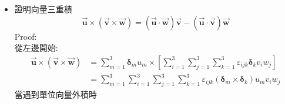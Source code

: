 \documentclass[../main.tex]{subfiles}
\begin{document}
\begin{itemize}
\begin{itemize}
\begin{align}
        - \sum_{i=1}^3 \sum_{j=1}^3 \sum_{m=1}^3 \sum_{n=1}^3 \delta_{in}\delta_{jm} v_i w_j v_m w_n \nonumber\\
        &= \sum_{i=1}^3 \sum_{j=1}^3 v_i w_j v_i w_j - \sum_{i=1}^3 \sum_{j=1}^3 v_i w_j v_j w_i \nonumber\\
        &= \sum_{i=1}^3 \sum_{j=1}^3 v_i^2 w_j^2 - \sum_{i=1}^3 \sum_{j=1}^3 v_i v_j w_i w_j 
      \end{align} 
      接著看左邊第二項:
      \begin{align}
        \left( \vec {\bm v} \cdot \vec {\bm w} \right)^2 &= \left(
          \sum_{i=1}^3 v_i w_i
        \right)^2 \nonumber\\
        &= \sum_{i=1}^3 \sum_{j=1}^3 v_i w_i v_j w_j
      \end{align}
      將兩項相加:
      \begin{align}
        \left(
          [\vec {\bm v} \times \vec {\bm w}] \cdot [\vec {\bm v} \times \vec {\bm w}]
        \right) + \left( \vec {\bm v} \cdot \vec {\bm w} \right)^2 &= 
        \left(
          \sum_{i=1}^3 \sum_{j=1}^3 v_i^2 w_j^2 - \sum_{i=1}^3 \sum_{j=1}^3 v_i v_j w_i w_j
        \right) + \left(
          \sum_{i=1}^3 \sum_{j=1} v_i w_i v_j w_j
        \right) \nonumber\\
        &= \sum_{i=1}^3 \sum_{j=1}^3 v_i^2 w_j^2 \nonumber\\
        &= \left(\sum_{i=1}^3 v_i^2\right) \left(\sum_{j=1}^3 w_j^2\right) \nonumber\\
        &= v^2 w^2
      \end{align}
    \item 證明向量三重積
      \begin{equation}
        \vec {\bm u} \times (\vec {\bm v} \times \vec {\bm w}) = (\vec {\bm u} \cdot \vec {\bm w})\vec {\bm v} - (\vec {\bm u} \cdot \vec {\bm v})\vec {\bm w}
      \end{equation}
      Proof:\\
      從左邊開始:
      \begin{align}
        \vec {\bm u} \times (\vec {\bm v} \times \vec {\bm w}) &= \sum_{m=1}^3 \bm \delta_m u_m \times
        \left[
          \sum_{i=1}^3 \sum_{j=1}^3 \sum_{k=1}^3 \varepsilon_{ijk} \bm \delta_k v_i w_j
        \right] \nonumber\\
        &= \sum_{m=1}^3 \sum_{i=1}^3 \sum_{j=1}^3 \sum_{k=1}^3
        \varepsilon_{ijk} (\bm \delta_m \times \bm \delta_k) u_m v_i w_j
      \end{align}
      當遇到單位向量外積時\\

\end{itemize}
\end{itemize}
\end{document}
